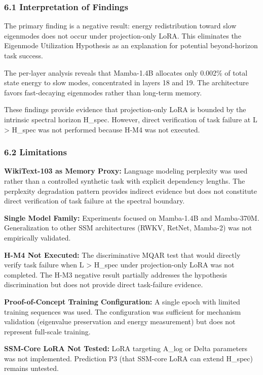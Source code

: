 
\subsubsection{6.1 Interpretation of Findings}

The primary finding is a negative result: energy redistribution toward slow eigenmodes does not occur under projection-only LoRA. This eliminates the Eigenmode Utilization Hypothesis as an explanation for potential beyond-horizon task success.

The per-layer analysis reveals that Mamba-1.4B allocates only 0.002\% of total state energy to slow modes, concentrated in layers 18 and 19. The architecture favors fast-decaying eigenmodes rather than long-term memory.

These findings provide evidence that projection-only LoRA is bounded by the intrinsic spectral horizon H\_spec. However, direct verification of task failure at L > H\_spec was not performed because H-M4 was not executed.

\subsubsection{6.2 Limitations}

\textbf{WikiText-103 as Memory Proxy:} Language modeling perplexity was used rather than a controlled synthetic task with explicit dependency lengths. The perplexity degradation pattern provides indirect evidence but does not constitute direct verification of task failure at the spectral boundary.

\textbf{Single Model Family:} Experiments focused on Mamba-1.4B and Mamba-370M. Generalization to other SSM architectures (RWKV, RetNet, Mamba-2) was not empirically validated.

\textbf{H-M4 Not Executed:} The discriminative MQAR test that would directly verify task failure when L > H\_spec under projection-only LoRA was not completed. The H-M3 negative result partially addresses the hypothesis discrimination but does not provide direct task-failure evidence.

\textbf{Proof-of-Concept Training Configuration:} A single epoch with limited training sequences was used. The configuration was sufficient for mechanism validation (eigenvalue preservation and energy measurement) but does not represent full-scale training.

\textbf{SSM-Core LoRA Not Tested:} LoRA targeting A\_log or Delta parameters was not implemented. Prediction P3 (that SSM-core LoRA can extend H\_spec) remains untested.

